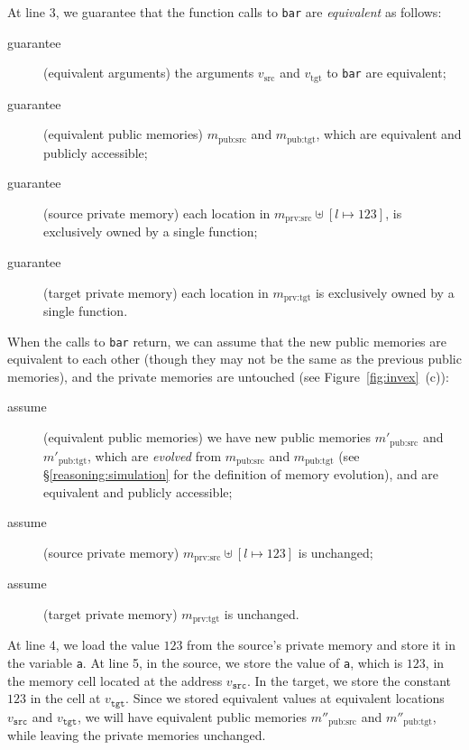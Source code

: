 At line 3, we guarantee that the function calls to \texttt{bar} are
\emph{equivalent} as follows:
\begin{description}
\item[guarantee] (equivalent arguments) 
  the arguments $v_\textrm{src}$ and $v_\textrm{tgt}$ to \texttt{bar} are equivalent; 
\item[guarantee] (equivalent public memories) 
  $m_\textrm{pub:src}$ and $m_\textrm{pub:tgt}$,
  which are equivalent and publicly accessible;
\item[guarantee] (source private memory) 
  each location in $m_\textrm{prv:src} \uplus {[l\mapsto 123]}$,
  is exclusively owned by a single function;
\item[guarantee] (target private memory) 
  each location in $m_\textrm{prv:tgt}$
  is exclusively owned by a single function.
\end{description}
When the calls to \texttt{bar} return,
we can assume that the new public
memories are equivalent to each other (though they may not be the same as the previous public memories), and
the private memories are untouched (see Figure~\ref{fig:invex}~(c)):
\begin{description}
\item[assume] (equivalent public memories) we have new public memories $m'_\textrm{pub:src}$ and
  $m'_\textrm{pub:tgt}$, which are \emph{evolved} from $m_\textrm{pub:src}$
  and $m_\textrm{pub:tgt}$ (see \S\ref{reasoning:simulation} for the definition of memory evolution), and 
  are equivalent and publicly accessible;
\item[assume] (source private memory) $m_\textrm{prv:src} \uplus
  {[l\mapsto 123]}$ is unchanged;
\item[assume] (target private memory) $m_\textrm{prv:tgt}$ is
  unchanged.
\end{description}

At line 4, we load the value $123$ from the source's private memory and
store it in the variable \texttt{a}.  At line 5, in the source, we
store the value of \texttt{a}, which is $123$, in the memory cell located at
the address $v_\texttt{src}$.  In the target, we store the constant
$123$ in the cell at $v_\texttt{tgt}$. Since we stored equivalent
values at equivalent locations $v_\texttt{src}$ and $v_\texttt{tgt}$,
we will have equivalent public memories $m''_\textrm{pub:src}$ and
$m''_\textrm{pub:tgt}$, while leaving the private memories unchanged.

